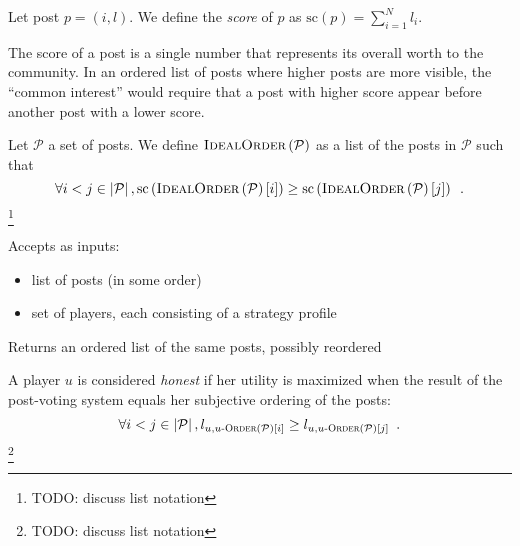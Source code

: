     \begin{definition}
      Let post $p = \left(i, l\right)$. We define the \emph{score} of $p$ as
      $\mathrm{sc}\left(p\right) = \sum\limits_{i = 1}^N l_i$.
    \end{definition}
    The score of a post is a single number that represents its overall worth to
    the community. In an ordered list of posts where higher posts are more
    visible, the ``common interest'' would require that a post with higher score
    appear before another post with a lower score.

    \begin{definition}
      Let $\mathcal{P}$ a set of posts. We define
      $\textsc{IdealOrder}\left(\mathcal{P}\right)$ as a list of the posts in
      $\mathcal{P}$ such that
      \begin{equation*}
        \forall i < j \in \left|\mathcal{P}\right|,
        \mathrm{sc}\left(\textsc{IdealOrder}
        \left(\mathcal{P}\right)\left[i\right]\right) \geq
        \mathrm{sc}\left(\textsc{IdealOrder}
        \left(\mathcal{P}\right)\left[j\right]\right) \enspace.
      \end{equation*}\footnote{TODO: discuss list notation}
    \end{definition}

    \begin{definition}
      Accepts as inputs:
      \begin{itemize}
        \item list of posts (in some order)
        \item set of players, each consisting of a strategy profile
      \end{itemize}
      Returns an ordered list of the same posts, possibly reordered
    \end{definition}

    \begin{definition}
      A player $u$ is considered \emph{honest} if her utility is maximized
      when the result of the post-voting system equals her subjective ordering
      of the posts:
      \begin{equation*}
        \forall i < j \in \left|\mathcal{P}\right|, l_{u, u\textsc{-Order}
        \left(\mathcal{P}\right)\left[i\right]} \geq l_{u, u\textsc{-Order}
        \left(\mathcal{P}\right)\left[j\right]}
        \enspace.
      \end{equation*}\footnote{TODO: discuss list notation}
    \end{definition}

